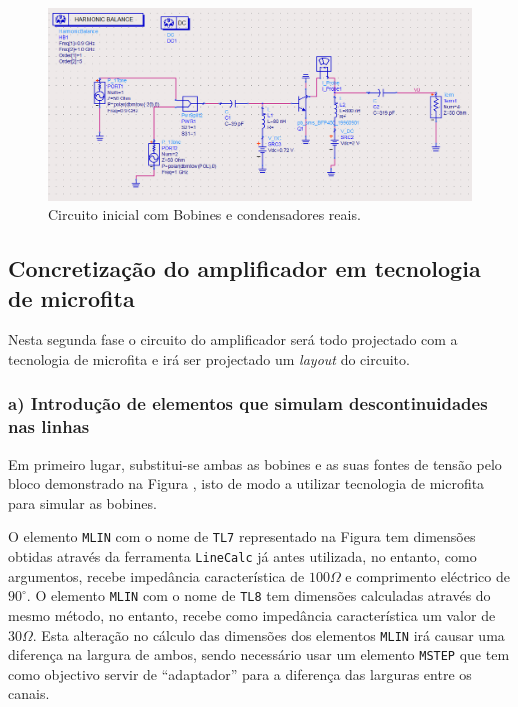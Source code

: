 \documentclass[11pt]{article}
\numberwithin{equation}{section}
\begin{document}
\begin{figure}[H]
	\centering
	\includegraphics[keepaspectratio=true, scale=0.45]{exps/Circuito_2c}
	\vspace{-0.5em}
	\caption{Circuito inicial com Bobines e condensadores reais.}
	\vspace{-0.8em}
	\label{fig:Circuito_0}
\end{figure}




\subsection{Concretização do amplificador em tecnologia de microfita}

Nesta segunda fase o circuito do amplificador será todo projectado com a tecnologia de microfita e irá ser projectado um \textit{layout} do circuito.

\subsubsection{a) Introdução de elementos que simulam descontinuidades nas linhas}

Em primeiro lugar, substitui-se ambas as bobines e as suas fontes de tensão pelo bloco demonstrado na Figura , isto de modo a utilizar tecnologia de microfita para simular as bobines. 


O elemento \texttt{MLIN} com o nome de \texttt{TL7} representado na Figura  tem dimensões obtidas através da ferramenta \texttt{LineCalc} já antes utilizada, no entanto, como argumentos, recebe impedância característica de $100 \Omega$ e comprimento eléctrico de $90^{\circ}$. O elemento \texttt{MLIN} com o nome de \texttt{TL8} tem dimensões calculadas através do mesmo método, no entanto, recebe como impedância característica um valor de $30 \Omega$. Esta alteração no cálculo das dimensões dos elementos \texttt{MLIN} irá causar uma diferença na largura de ambos, sendo necessário usar um elemento \texttt{MSTEP} que tem como objectivo servir de ``adaptador'' para a diferença das larguras entre os canais.
\end{document}
